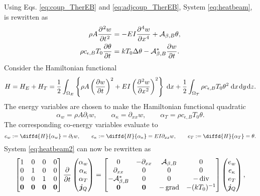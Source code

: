 Using Eqs. \eqref{eq:coup_TherEB} and \eqref{eq:adjcoup_TherEB}, System \eqref{eq:heatbeam}, is rewritten as
\begin{equation}\label{eq:heatbeam2}
\begin{aligned}
\rho A \diffp[2]{w}{t} &= - EI \diffp[4]{w}{x} + \mathcal{A}_{\beta, B} \theta, \\
\rho c_{\epsilon, B} T_0 \diffp{\theta}{t} &= k T_0 \Delta \theta - \mathcal{A}_{\beta, B}^* \diffp{w}{t}.
\end{aligned}
\end{equation} 
Consider the Hamiltonian functional
\begin{equation}
H = H_E + H_T = \frac{1}{2}\int_{\Omega_E}\left\{\rho A \left(\diffp{w}{t}\right)^2 + E I \left(\diffp[2]{w}{x} \right)^2 \right\} \d{x} + \frac{1}{2}\int_{\Omega_T} \rho c_{\epsilon, B} T_0\theta^2 \d{x}\d{y}\d{z}.
\end{equation}
The energy variables are chosen to make the Hamiltonian functional quadratic
\begin{equation}
\alpha_w = \rho A \partial_t w, \qquad \alpha_\kappa = \partial_{xx} w, \qquad \alpha_T = \rho c_{\epsilon, B}  T_0 \theta.
\end{equation}
The corresponding co-energy variables evaluate to
\begin{equation}
	e_w := \diffd{H}{\alpha_w} = \partial_t w, \qquad e_\kappa := \diffd{H}{\alpha_\kappa} = EI \partial_{xx} w, \qquad 	e_T := \diffd{H}{\alpha_T} = \theta. 
\end{equation}
System \eqref{eq:heatbeam2} can now be rewritten as
\begin{equation}\label{eq:phsysTEbeam}
\begin{bmatrix}
1 & 0 & 0 & 0\\
0 & 1 & 0 & 0\\
0 & 0 & 1 & 0\\
\bm{0} & \bm{0} & \bm{0} & \bm{0}\\
\end{bmatrix}
\diffp{}{t}
\begin{pmatrix}
\alpha_w \\
\alpha_\kappa \\
{\alpha}_T \\
\bm{j}_Q \\
\end{pmatrix} = 
\begin{bmatrix}
{0} & -\partial_{xx} &  \mathcal{A}_{\beta, B} & {0}\\
\partial_{xx} & {0} & {0} & {0} \\
-\mathcal{A}_{\beta, B}^* & 0 & 0 & -\div \\
\bm{0} & \bm{0} & -\grad & - (k T_0)^{-1} \\
\end{bmatrix}
\begin{pmatrix}
e_w \\
e_\kappa \\
e_T \\
\bm{j}_Q \\
\end{pmatrix}, 
\end{equation}
